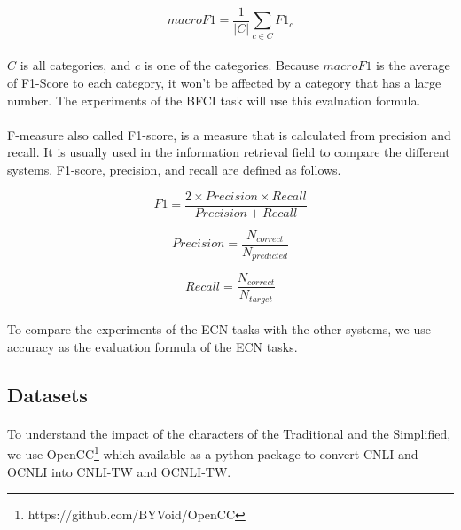 \documentclass{article}
\begin{document}
\begin{CJK*}{UTF8}{bkai}
\begin{equation}
  macroF1=\frac{1}{|C|}\sum_{c\in C}F1_c
\end{equation}

\paragraph{}
$C$ is all categories, and $c$ is one of the categories. Because $macroF1$ is the average of F1-Score to each category, it won't be affected by a category that has a large number. The experiments of the BFCI task will use this evaluation formula.

\paragraph{}
F-measure also called F1-score, is a measure that is calculated from precision and recall. It is usually used in the information retrieval field to compare the different systems. F1-score, precision, and recall are defined as follows.

\begin{equation}
  F1=\frac{2\times Precision\times Recall}{Precision+Recall}
\end{equation}

\begin{equation}
  Precision=\frac{N_{correct}}{N_{predicted}}
\end{equation}

\begin{equation}
  Recall=\frac{N_{correct}}{N_{target}}
\end{equation}

\paragraph{}
To compare the experiments of the ECN tasks with the other systems, we use accuracy as the evaluation formula of the ECN tasks.

\subsection{Datasets}
\paragraph{}
To understand the impact of the characters of the Traditional and the Simplified, we use OpenCC\footnote{https://github.com/BYVoid/OpenCC} which available as a python package to convert CNLI and OCNLI into CNLI-TW and OCNLI-TW.


\end{CJK*}
\end{document}
